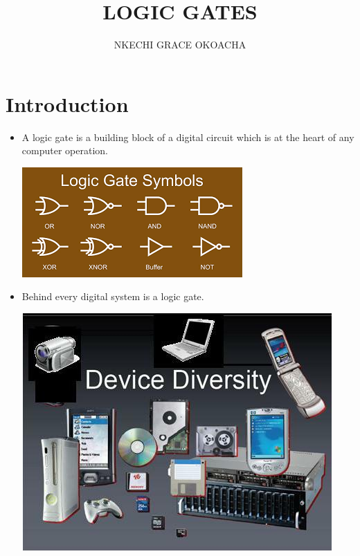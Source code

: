 \documentclass{article}
\begin{document}
	\title{LOGIC GATES}
	
	\author{NKECHI GRACE OKOACHA}
	
	\maketitle
	
\tableofcontents
	
\newpage

\section{Introduction}

\label{intro}
	\begin{itemize}
		\item A logic gate is a building block of a digital circuit which is at the heart of any computer operation. \\
		
	\begin{center}
		\includegraphics{pic1}
	\end{center}
		
		\item Behind every digital system is a logic gate. \\
		
		\begin{center}
			\includegraphics{pic2}
		\end{center}
		

\end{itemize}
\end{document}
